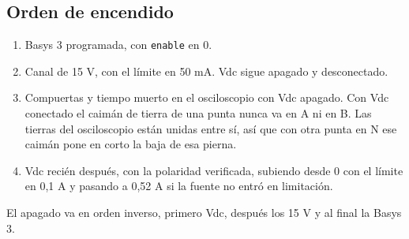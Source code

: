 \documentclass[11pt]{article}
\begin{document}
\subsection*{Orden de encendido}
\begin{enumerate}[leftmargin=*, itemsep=2pt]
  \item Basys 3 programada, con \texttt{enable} en 0.
  \item Canal de 15 V, con el límite en 50 mA. Vdc sigue apagado y desconectado.
  \item Compuertas y tiempo muerto en el osciloscopio con Vdc apagado. Con Vdc conectado el caimán de tierra de una punta nunca va en A ni en B. Las tierras del osciloscopio están unidas entre sí, así que con otra punta en N ese caimán pone en corto la baja de esa pierna.
  \item Vdc recién después, con la polaridad verificada, subiendo desde 0 con el límite en 0,1 A y pasando a 0,52 A si la fuente no entró en limitación.
\end{enumerate}
El apagado va en orden inverso, primero Vdc, después los 15 V y al final la Basys 3.
\end{document}
